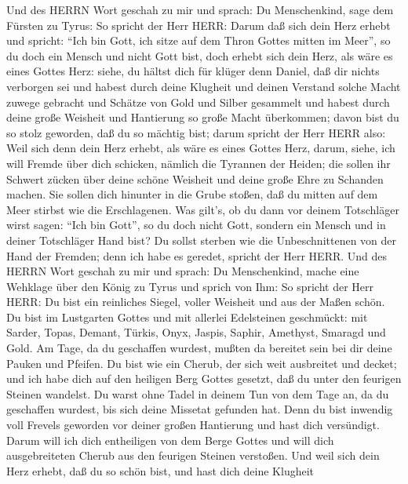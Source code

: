  Und des HERRN Wort geschah zu mir und sprach: 
Du Menschenkind, sage dem Fürsten zu Tyrus: So spricht der Herr HERR:
Darum daß sich dein Herz erhebt und spricht: ``Ich bin Gott, ich sitze
auf dem Thron Gottes mitten im Meer'', so du doch ein Mensch und nicht
Gott bist, doch erhebt sich dein Herz, als wäre es eines Gottes Herz:
 siehe, du hältst dich für klüger denn Daniel, daß dir
nichts verborgen sei  und habest durch deine Klugheit und
deinen Verstand solche Macht zuwege gebracht und Schätze von Gold und
Silber gesammelt  und habest durch deine große Weisheit und
Hantierung so große Macht überkommen; davon bist du so stolz geworden,
daß du so mächtig bist;  darum spricht der Herr HERR also:
Weil sich denn dein Herz erhebt, als wäre es eines Gottes Herz,
 darum, siehe, ich will Fremde über dich schicken, nämlich
die Tyrannen der Heiden; die sollen ihr Schwert zücken über deine schöne
Weisheit und deine große Ehre zu Schanden machen.  Sie
sollen dich hinunter in die Grube stoßen, daß du mitten auf dem Meer
stirbst wie die Erschlagenen.  Was gilt's, ob du dann vor
deinem Totschläger wirst sagen: ``Ich bin Gott'', so du doch nicht Gott,
sondern ein Mensch und in deiner Totschläger Hand bist?  Du
sollst sterben wie die Unbeschnittenen von der Hand der Fremden; denn
ich habe es geredet, spricht der Herr HERR.  Und des HERRN
Wort geschah zu mir und sprach:  Du Menschenkind, mache
eine Wehklage über den König zu Tyrus und sprich von Ihm: So spricht der
Herr HERR: Du bist ein reinliches Siegel, voller Weisheit und aus der
Maßen schön.  Du bist im Lustgarten Gottes und mit allerlei
Edelsteinen geschmückt: mit Sarder, Topas, Demant, Türkis, Onyx, Jaspis,
Saphir, Amethyst, Smaragd und Gold. Am Tage, da du geschaffen wurdest,
mußten da bereitet sein bei dir deine Pauken und Pfeifen. 
Du bist wie ein Cherub, der sich weit ausbreitet und decket; und ich
habe dich auf den heiligen Berg Gottes gesetzt, daß du unter den
feurigen Steinen wandelst.  Du warst ohne Tadel in deinem
Tun von dem Tage an, da du geschaffen wurdest, bis sich deine Missetat
gefunden hat.  Denn du bist inwendig voll Frevels geworden
vor deiner großen Hantierung und hast dich versündigt. Darum will ich
dich entheiligen von dem Berge Gottes und will dich ausgebreiteten
Cherub aus den feurigen Steinen verstoßen.  Und weil sich
dein Herz erhebt, daß du so schön bist, und hast dich deine Klugheit
